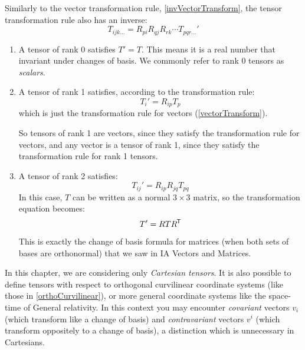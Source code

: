 \documentclass[../main.tex]{subfiles}
\begin{document}
Similarly to the vector transformation rule, \cref{invVectorTransform}, the tensor transformation rule also has an inverse:
\begin{equation}
  T_{ijk\ldots} = R_{pi}R_{q j}R_{r k} \cdots T_{pqr\ldots}' \label{invTensorTransform}
\end{equation}
\begin{example}
  \begin{enumerate}
    \item A tensor of rank 0 satisfies $T' = T$.
      This means it is a real number that invariant under changes of basis.
      We commonly refer to rank 0 tensors as \textit{scalars}.
    \item A tensor of rank 1 satisfies, according to the transformation rule:
      \[
        T_i' = R_{i p}T_p
      \]
      which is just the transformation rule for vectors (\cref{vectorTransform}).

      So tensors of rank 1 are vectors, since they satisfy the transformation rule for vectors, and any vector is a tensor of rank 1, since they satisfy the transformation rule for rank 1 tensors.
    \item A tensor of rank 2 satisfies:
      \begin{equation}
        T_{i j}' = R_{ip}R_{jq}T_{p q} \label{rank2Transform}
      \end{equation}
      In this case, $T$ can be written as a normal $3 \times 3$ matrix, so the transformation equation becomes:
      \begin{equation}
        T' = RTR^{{\mkern-1.5mu\mathsf{T}}} \label{matrixTensorLaw}
      \end{equation}
      This is exactly the change of basis formula for matrices (when both sets of bases are orthonormal) that we saw in IA Vectors and Matrices.
  \end{enumerate}
\end{example}
\begin{remark}
  \nonexaminable
  In this chapter, we are considering only \textit{Cartesian tensors}.
  It is also possible to define tensors with respect to orthogonal curvilinear coordinate systems (like those in \cref{orthoCurvilinear}), or more general coordinate systems like the space-time of General relativity.
  In this context you may encounter \textit{covariant} vectors $v_i$ (which transform like a change of basis) and \textit{contravariant} vectors $v^{i}$ (which transform oppositely to a change of basis), a distinction which is unnecessary in Cartesians.
\end{remark}
\end{document}
